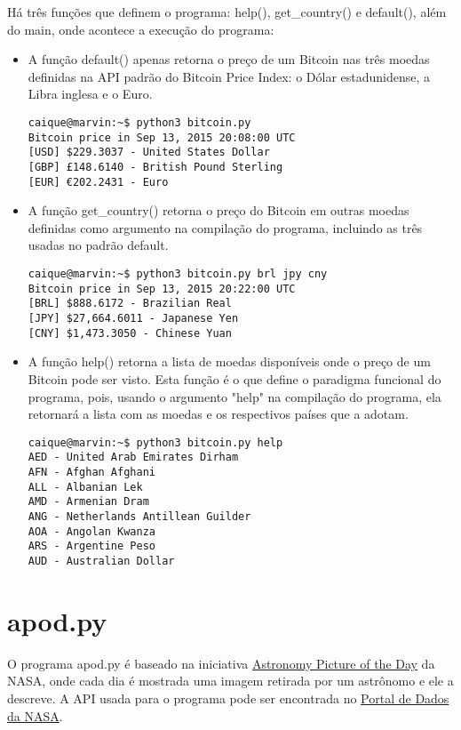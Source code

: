 \documentclass{article}
\begin{document}
Há três funções que definem o programa: help(), get\_country() e default(), além do main, onde acontece a execução do programa:
\begin{itemize}
    \item A função default() apenas retorna o preço de um Bitcoin nas três moedas definidas na API padrão do Bitcoin Price Index: o Dólar estadunidense, a Libra inglesa e o Euro.
\begin{verbatim}caique@marvin:~$ python3 bitcoin.py 
Bitcoin price in Sep 13, 2015 20:08:00 UTC
[USD] $229.3037 - United States Dollar
[GBP] £148.6140 - British Pound Sterling
[EUR] €202.2431 - Euro
\end{verbatim}
    
    \item A função get\_country() retorna o preço do Bitcoin em outras moedas definidas como argumento na compilação do programa, incluindo as três usadas no padrão default.
\begin{verbatim}caique@marvin:~$ python3 bitcoin.py brl jpy cny
Bitcoin price in Sep 13, 2015 20:22:00 UTC
[BRL] $888.6172 - Brazilian Real
[JPY] $27,664.6011 - Japanese Yen
[CNY] $1,473.3050 - Chinese Yuan
    \end{verbatim}
    
    \item A função help() retorna a lista de moedas disponíveis onde o preço de um Bitcoin pode ser visto. Esta função é o que define o paradigma funcional do programa, pois, usando o argumento "help" na compilação do programa, ela retornará a lista com as moedas e os respectivos países que a adotam.
\begin{verbatim}caique@marvin:~$ python3 bitcoin.py help
AED - United Arab Emirates Dirham
AFN - Afghan Afghani
ALL - Albanian Lek
AMD - Armenian Dram
ANG - Netherlands Antillean Guilder
AOA - Angolan Kwanza
ARS - Argentine Peso
AUD - Australian Dollar    
\end{verbatim}
\end{itemize}

\newpage
\section*{apod.py}
O programa apod.py é baseado na iniciativa \href{http://apod.nasa.gov/apod/astropix.html}{Astronomy Picture of the Day} da NASA, onde cada dia é mostrada uma imagem retirada por um astrônomo e ele a descreve. A API usada para o programa pode ser encontrada no \href{https://data.nasa.gov/developer}{Portal de Dados da NASA}.
\end{document}
